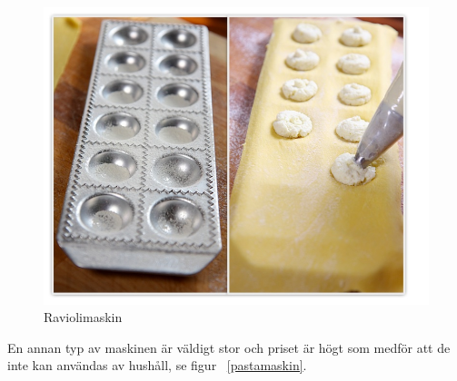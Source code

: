 	\begin{figure}[h]
		\begin{center}
			\includegraphics[scale=0.5]{images/raviolimoldwithfilling.jpg}
			\caption{Raviolimaskin}
			\label{ravioli}	
		\end{center}
	\end{figure}
En annan typ av maskinen är väldigt stor och priset är högt som medför att de inte kan användas av hushåll, se figur ~\ref{pastamaskin}.
